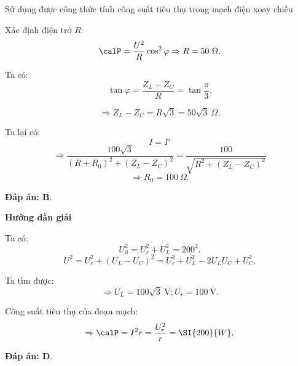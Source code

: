 \begin{dang}{Sử dụng được công thức tính công suất tiêu thụ trong mạch điện xoay chiều}
{		Xác định điện trở $R$:
		$$\calP = \dfrac{U^2}{R} \cos^2 \varphi \Rightarrow R = 50\ \Omega.$$
		
		Ta có:
		$$\tan \varphi = \dfrac{Z_L-Z_C}{R} = \tan \dfrac{\pi}{3}.$$
		
		$$\Rightarrow Z_L - Z_C = R\sqrt 3 = 50\sqrt 3\ \Omega.$$
		
		Ta lại có:
		$$I = I'$$
		$$\Rightarrow \dfrac{100\sqrt 3}{(R+R_0)^2 + (Z_L-Z_C)^2} = \dfrac{100}{\sqrt{R^2 + (Z_L-Z_C)^2}} $$
		$$\Rightarrow R_0 =100\ \Omega.$$
		
		\textbf{Đáp án: B}.
	}
	{	\begin{center}
			\textbf{Hướng dẫn giải}
		\end{center}
		
		Ta có:
		$$U^2_\text{d} =U^2_r + U^2_L = 200^2.$$
		$$U^2 =U^2_r +(U_L -U_C)^2 = U^2_r +U^2_L-2U_LU_C +U^2_C.$$
		
		Ta tìm được: 
		$$\Rightarrow U_L = 100\sqrt 3\ \text{V}; U_r =100\ \text{V}.$$
		
		Công suất tiêu thụ của đoạn mạch:
		$$\Rightarrow \calP =I^2r =\dfrac{U^2_r}{r} = \SI{200}{W}.$$
		
		\textbf{Đáp án: D}.
	}
\end{dang}
